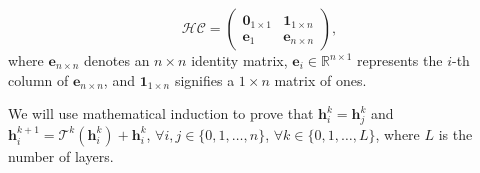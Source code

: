 \begin{equation}
\label{eq:nxn_sequential}
\mathcal{HC}=\begin{pmatrix}
\mathbf{0}_{1 \times 1} & \mathbf{1}_{1 \times n}\\
\mathbf{e}_1 & \mathbf{e}_{n\times n}
\end{pmatrix},
\end{equation}
where $\mathbf{e}_{n\times n}$ denotes an $n \times n$ identity matrix, $\mathbf{e}_i \in \mathbb{R}^{n \times 1}$ represents the $i$-th column of $\mathbf{e}_{n\times n}$, and $\mathbf{1}_{1 \times n}$ signifies a $1 \times n$ matrix of ones.

We will use mathematical induction to prove that $\mathbf{h}_i^k = \mathbf{h}_j^k$ and $\mathbf{h}_i^{k+1} = \mathcal{T}^k(\mathbf{h}_i^k) + \mathbf{h}_i^k$, $\forall i,j \in \{0, 1, \ldots, n\}$, $\forall k \in \{0, 1, \ldots, L\}$, where $L$ is the number of layers.

